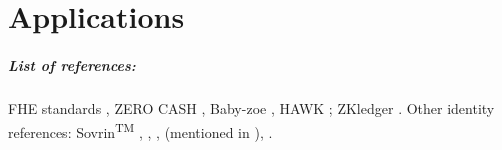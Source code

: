 \chapter{Applications}
\label{chap:apps}





\paragraph{List of references:}

FHE standards \cite{2017:applications-of-homomorphic-encryption},
ZERO CASH \cite{2014:SP:Zerocash},
Baby-zoe \cite{2018:github:baby-zoe},
HAWK \red{\cite{}}; %
ZKledger \cite{2018:NSDI:zkLedger}.
	Other identity references:
Sovrin\textsuperscript{TM} \cite{2018:sovrin}, 
\cite{2014:architecture-for-ABC-technologies}, 
\cite{2017:ccs:Practical-UC-Secure-Delegatable-Credentials-with-attributes},
\cite{2017:SP:Accumulators-with-Applications-to-Anonymity-Preserving-Revocation} (mentioned in ),
\cite{2010:SCN:Solving-Revocation-with-Efficient-Update-of-Anonymous-Credentials}.

